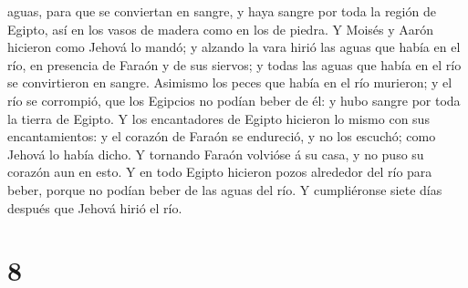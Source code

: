 aguas, para que se conviertan en sangre, y haya sangre por toda la
región de Egipto, así en los vasos de madera como en los de piedra.
 Y Moisés y Aarón hicieron como Jehová lo mandó; y alzando
la vara hirió las aguas que había en el río, en presencia de Faraón y de
sus siervos; y todas las aguas que había en el río se convirtieron en
sangre.  Asimismo los peces que había en el río murieron; y
el río se corrompió, que los Egipcios no podían beber de él: y hubo
sangre por toda la tierra de Egipto.  Y los encantadores de
Egipto hicieron lo mismo con sus encantamientos: y el corazón de Faraón
se endureció, y no los escuchó; como Jehová lo había dicho.
 Y tornando Faraón volvióse á su casa, y no puso su corazón
aun en esto.  Y en todo Egipto hicieron pozos alrededor del
río para beber, porque no podían beber de las aguas del río.
 Y cumpliéronse siete días después que Jehová hirió el río.

\hypertarget{section-7}{%
\section{8}\label{section-7}}

